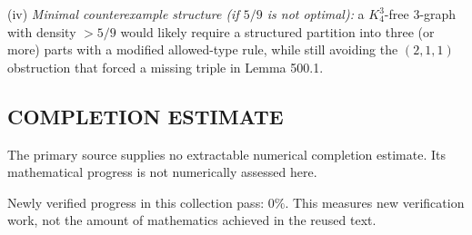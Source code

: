 (iv) \emph{Minimal counterexample structure (if $5/9$ is not optimal):} a $K_4^3$-free $3$-graph with density $>5/9$ would likely require a structured partition into three (or more) parts with a modified allowed-type rule, while still avoiding the $(2,1,1)$ obstruction that forced a missing triple in Lemma 500.1.




\subsection*{COMPLETION ESTIMATE}
The primary source supplies no extractable numerical completion estimate. Its mathematical progress is not numerically assessed here.

Newly verified progress in this collection pass: $0\%$. This measures new verification work, not the amount of mathematics achieved in the reused text.
